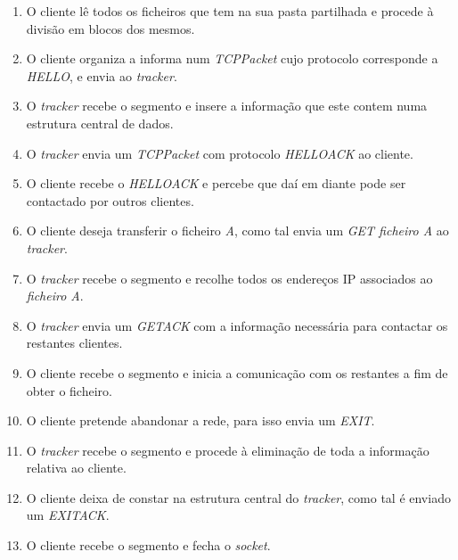         \begin{enumerate}
            
            \item O cliente lê todos os ficheiros que tem na sua pasta partilhada e procede à divisão em blocos dos mesmos.

            \item O cliente organiza a informa num \textit{TCPPacket} cujo protocolo corresponde a \textit{HELLO}, e envia ao \textit{tracker}.

            \item O \textit{tracker} recebe o segmento e insere a informação que este contem numa estrutura central de dados.

            \item O \textit{tracker} envia um \textit{TCPPacket} com protocolo \textit{HELLOACK} ao cliente.

            \item O cliente recebe o \textit{HELLOACK} e percebe que daí em diante pode ser contactado por outros clientes.

            \item O cliente deseja transferir o ficheiro \textit{A}, como tal envia um \textit{GET ficheiro A} ao \textit{tracker}.

            \item O \textit{tracker} recebe o segmento e recolhe todos os endereços IP associados ao \textit{ficheiro A}.

            \item O \textit{tracker} envia um \textit{GETACK} com a informação necessária para contactar os restantes clientes.

            \item O cliente recebe o segmento e inicia a comunicação com os restantes a fim de obter o ficheiro.

            \item O cliente pretende abandonar a rede, para isso envia um \textit{EXIT}.

            \item O \textit{tracker} recebe o segmento e procede à eliminação de toda a informação relativa ao cliente.
            
            \item O cliente deixa de constar na estrutura central do \textit{tracker}, como tal é enviado um \textit{EXITACK}.

            \item O cliente recebe o segmento e fecha o \textit{socket}. 

        \end{enumerate}

